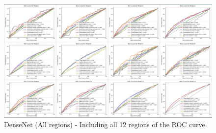\documentclass[10pt,twocolumn,letterpaper]{article}
\begin{document}
\clearpage
\onecolumn
\begin{landscape}
\begin{figure}[htbp]
    \centering
    \includegraphics[width=1.35\textwidth]{assets/all_regions.png}
    \caption{DenseNet (All regions) - Including all 12 regions of the ROC curve.}
    \label{fig:enter-label}
\end{figure}
\end{landscape}
\end{document}
